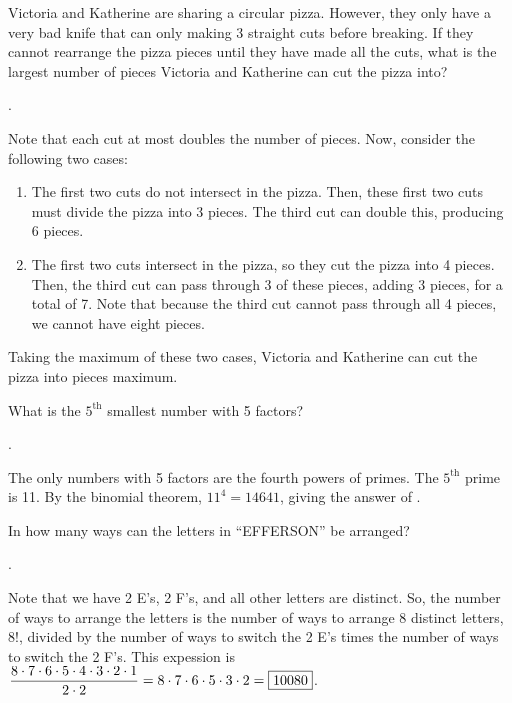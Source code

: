 \documentclass[11pt]{article}
\DeclareRobustCommand{\frac}[3][0pt]{%
  {\begingroup\hspace{#1}#2\hspace{#1}\endgroup\over\hspace{#1}#3\hspace{#1}}}
\begin{document}
\begin{problem} Victoria and Katherine are sharing a circular pizza. However, they only have a very bad knife that can only making 3 straight cuts before breaking. If they cannot rearrange the pizza pieces until they have made all the cuts, what is the largest number of pieces Victoria and Katherine can cut the pizza into?
\end{problem}

\begin{answer} . \end{answer}
\begin{solution}
Note that each cut at most doubles the number of pieces. Now, consider the following two cases:
\begin{enumerate}
\item The first two cuts do not intersect in the pizza. Then, these first two cuts must divide the pizza into 3 pieces. The third cut can double this, producing 6 pieces.
\item The first two cuts intersect in the pizza, so they cut the pizza into 4 pieces. Then, the third cut can pass through 3 of these pieces, adding 3 pieces, for a total of 7. Note that because the third cut cannot pass through all 4 pieces, we cannot have eight pieces.
\end{enumerate}
Taking the maximum of these two cases, Victoria and Katherine can cut the pizza into  pieces maximum.
\end{solution}

\begin{problem} What is the  $5^{\text{th}}$ smallest number with 5 factors?
\end{problem}

\begin{answer} . \end{answer}
\begin{solution}
The only numbers with 5 factors are the fourth powers of primes. The $5^{\text{th}}$ prime is 11. By the binomial theorem, $11^4 = 14641$, giving the answer of .
\end{solution}

\begin{problem} In how many ways can the letters in ``EFFERSON'' be arranged?
\end{problem}

\begin{answer} . \end{answer}
\begin{solution}
Note that we have 2 E's, 2 F's, and all other letters are distinct. So, the number of ways to arrange the letters is the number of ways to arrange 8 distinct letters, 8!, divided by the number of ways to switch the 2 E's times the number of ways to switch the 2 F's. This expession is $\displaystyle \frac{8 \cdot 7 \cdot 6 \cdot 5 \cdot 4 \cdot 3 \cdot 2 \cdot 1}{2 \cdot 2} = 8 \cdot 7 \cdot 6 \cdot 5 \cdot 3 \cdot 2 = \boxed{10080}$.
\end{solution}
\end{document}
